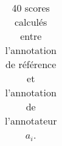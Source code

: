 \begin{table}
\begin{tabular}{|l|l|l|l|l|}
\end{tabular}
\caption{40 scores calculés entre l'annotation de référence et l'annotation de l'annotateur $a_i$.}
\label{tab:tousScoresAnnotateurs}
\end{table}
